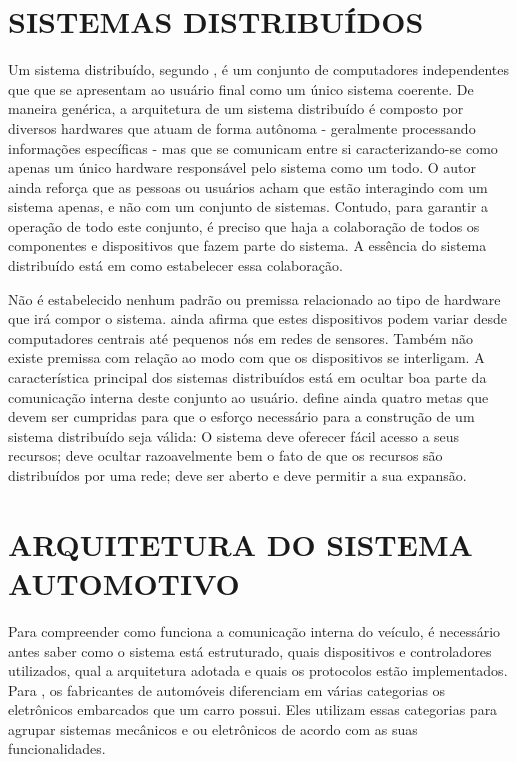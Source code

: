 \section{SISTEMAS DISTRIBUÍDOS}\label{secaosistemasdistribuidos}
Um sistema distribuído, segundo , é um conjunto de computadores independentes que que se apresentam ao usuário final como um único sistema coerente. De maneira genérica, a arquitetura de um sistema distribuído é composto por diversos hardwares que atuam de forma autônoma - geralmente processando informações específicas - mas que se comunicam entre si caracterizando-se como apenas um único hardware responsável pelo sistema como um todo. O autor ainda reforça que as pessoas ou usuários acham que estão interagindo com um sistema apenas, e não com um conjunto de sistemas. Contudo, para garantir a operação de todo este conjunto, é preciso que haja a colaboração de todos os componentes e dispositivos que fazem parte do sistema. A essência do sistema distribuído está em como estabelecer essa colaboração.

Não é estabelecido nenhum padrão ou premissa relacionado ao tipo de hardware que irá compor o sistema.  ainda afirma que estes dispositivos podem variar desde computadores centrais até pequenos nós em redes de sensores. Também não existe premissa com relação ao modo com que os dispositivos se interligam. A característica principal dos sistemas distribuídos está em ocultar boa parte da comunicação interna deste conjunto ao usuário.  define ainda quatro metas que devem ser cumpridas para que o esforço necessário para a construção de um sistema distribuído seja válida: O sistema deve oferecer fácil acesso a seus recursos; deve ocultar razoavelmente bem o fato de que os recursos são distribuídos por uma rede; deve ser aberto e deve permitir a sua expansão.


\section{ARQUITETURA DO SISTEMA AUTOMOTIVO}
Para compreender como funciona a comunicação interna do veículo, é necessário antes saber como o sistema está estruturado, quais dispositivos e controladores utilizados, qual a arquitetura adotada e quais os protocolos estão implementados. Para , os fabricantes de automóveis diferenciam em várias categorias os eletrônicos embarcados que um carro possui. Eles utilizam essas categorias para agrupar sistemas mecânicos e ou eletrônicos de acordo com as suas funcionalidades.

